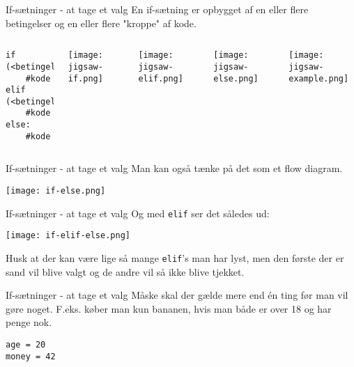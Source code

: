 \documentclass[main.tex]{subfiles}
\begin{document}
\begin{frame}[fragile]{If-sætninger - at tage et valg}
	En if-sætning er opbygget af en eller flere betingelser og en eller flere "kroppe" af kode.
	
	\begin{columns}
	
	\begin{lstlisting}[style=python]
if (<betingelse>):
	#kode
elif (<betingelse):
	#kode
else:
	#kode
	\end{lstlisting}
	
	\centering
	\texttt{[image: jigsaw-if.png]}
	
	\texttt{[image: jigsaw-elif.png]}
	
	\texttt{[image: jigsaw-else.png]}
	
	\centering
	
	\texttt{[image: jigsaw-example.png]}
	
	\end{columns}
\end{frame}


\begin{frame}[fragile]{If-sætninger - at tage et valg}
Man kan også tænke på det som et flow diagram.
\begin{center}
\texttt{[image: if-else.png]}
\end{center}

\end{frame}


\begin{frame}[fragile]{If-sætninger - at tage et valg}
Og med \texttt{elif} ser det således ud:
\begin{center}
	\texttt{[image: if-elif-else.png]}
\end{center}

Husk at der kan være lige så mange \texttt{elif}'s man har lyst, men den første der er sand vil blive valgt og de andre vil så ikke blive tjekket.

\end{frame}


\begin{frame}[fragile]{If-sætninger - at tage et valg}
	Måske skal der gælde mere end én ting før man vil gøre noget. F.eks. køber man kun bananen, hvis man både er over 18 og har penge nok. 
	\begin{lstlisting}[style=python]
age = 20
money = 42
	\end{lstlisting}
\end{frame}
\end{document}
